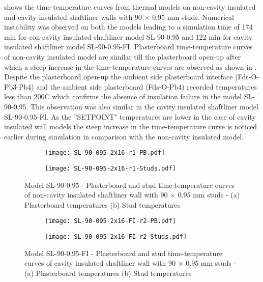  shows the time-temperature curves from thermal models on non-cavity insulated and cavity insulated shaftliner walls with 90 $\times$ 0.95 mm studs. Numerical instability was observed on both the models leading to a simulation time of 174 min for con-cavity insulated shaftliner model SL-90-0.95 and 122 min for cavity insulated shaftliner model SL-90-0.95-FI. Plasterboard time-temperature curves of non-cavity insulated model are similar till the plasterboard open-up after which a steep increase in the time-temperature curves are observed as shown in . Despite the plasterboard open-up the ambient side plasterboard interface (Fds-O-Pb3-Pb4) and the ambient side plasterboard (Fds-O-Pb4) recorded temperatures less than 200\degree C which confirms the absence of insulation failure in the model SL-90-0.95. This observation was also similar in the cavity insulated shaftliner model SL-90-0.95-FI. As the ''SETPOINT" temperatures are lower in the case of cavity insulated wall models the steep increase in the time-temperature curve is noticed earlier during simulation in comparison with the non-cavity insulated model. 
\begin{figure}[!htbp]
	\centering
	\begin{subfigure}[b]{0.6\textwidth}
		\centering
		\texttt{[image: SL-90-095-2x16-r1-PB.pdf]}
		\caption{}
		\label{subfig:SL-90-095-2x16-r1-PB}
	\end{subfigure}
	\begin{subfigure}[b]{0.6\textwidth}
		\centering
		\texttt{[image: SL-90-095-2x16-r1-Studs.pdf]}
		\caption{}
		\label{subfig:SL-90-095-2x16-r1-Studs}
	\end{subfigure}
	   \caption{Model SL-90-0.95 - Plasterboard and stud time-temperature curves of non-cavity insulated shaftliner wall with 90 $\times$ 0.95 mm studs - (a) Plasterboard temperatures (b) Stud temperatures}
	   \label{fig:SL-90-095-2x16-r1}
\end{figure}
\begin{figure}[!htbp]
	\centering
	\begin{subfigure}[b]{0.6\textwidth}
		\centering
		\texttt{[image: SL-90-095-2x16-FI-r2-PB.pdf]}
		\caption{}
		\label{subfig:SL-90-095-2x16-FI-r2-PB}
	\end{subfigure}
	\begin{subfigure}[b]{0.6\textwidth}
		\centering
		\texttt{[image: SL-90-095-2x16-FI-r2-Studs.pdf]}
		\caption{}
		\label{subfig:SL-90-095-2x16-FI-r2-Studs}
	\end{subfigure}
	   \caption{Model SL-90-0.95-FI - Plasterboard and stud time-temperature curves of cavity insulated shaftliner wall with 90 $\times$ 0.95 mm studs - (a) Plasterboard temperatures (b) Stud temperatures}
	   \label{fig:SL-90-095-2x16-FI-r2}
\end{figure}


